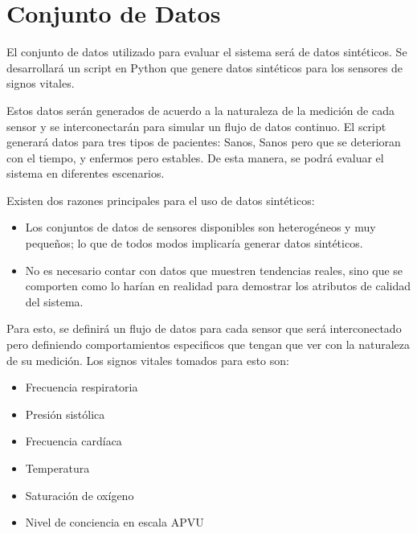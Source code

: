 \section{Conjunto de Datos}

El conjunto de datos utilizado para evaluar el sistema será de datos sintéticos. 
Se desarrollará un script en Python que genere datos sintéticos para los sensores de signos vitales.\newline

Estos datos serán generados de acuerdo a la naturaleza de la medición de cada sensor y se interconectarán para simular un flujo de datos continuo.
El script generará datos para tres tipos de pacientes: Sanos, Sanos pero que se deterioran con el tiempo, y enfermos pero estables. 
De esta manera, se podrá evaluar el sistema en diferentes escenarios.\newline

Existen dos razones principales para el uso de datos sintéticos: 

\begin{itemize}
    \item Los conjuntos de datos de sensores disponibles son heterogéneos y muy pequeños; lo que de todos modos implicaría generar datos sintéticos.
    \item No es necesario contar con datos que muestren tendencias reales, sino que se comporten como lo harían en realidad para demostrar los atributos de calidad del sistema.
\end{itemize}

Para esto, se definirá un flujo de datos para cada sensor que será interconectado pero definiendo comportamientos especificos que tengan que ver con la naturaleza de su medición.
Los signos vitales tomados para esto son: 

\begin{itemize}
    \item Frecuencia respiratoria
    \item Presión sistólica
    \item Frecuencia cardíaca
    \item Temperatura
    \item Saturación de oxígeno
    \item Nivel de conciencia en escala APVU
\end{itemize}